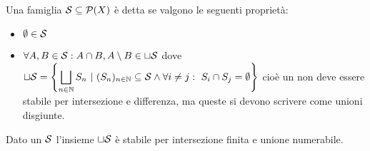 \begin{definition}[\Semiring{}]
	Una famiglia $\S\subseteq \mathcal P(X)$ è detta \semiring{} se valgono le seguenti proprietà:
	\begin{itemize}
		\item $\emptyset\in \S$
		\item $\displaystyle\forall A,B\in \S: A\cap B, A\setminus B\in \sqcup \S$ dove
		$\displaystyle
		\sqcup{ \S }=\left\{\bigsqcup_{n\in \N} S_n\ |\ (S_n)_{n\in\N} \subseteq \S \wedge \forall i\not= j:\ S_i\cap S_j=\emptyset\right\}$ 
		cioè un \semiring{} non deve essere stabile per intersezione e differenza, ma queste si devono scrivere come unioni disgiunte.
	\end{itemize}
\end{definition}

\begin{proposition}\label{UnioneDisgiuntaQuasiAlgebra}
	Dato un \semiring{} $\S$ l'insieme $\sqcup\S$ è stabile per intersezione finita e unione numerabile.
\end{proposition}
